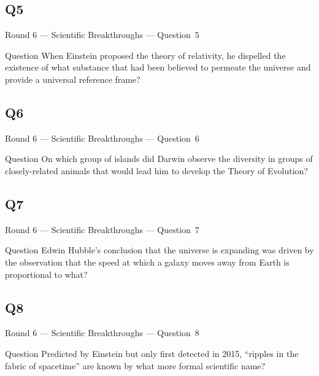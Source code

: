 \documentclass[11pt]{beamer}
\begin{document}
\subsection*{Q5}
\begin{frame}[t]{Round 6 --- Scientific Breakthroughs --- \mbox{Question 5}}
\vspace{-0.5em}
\begin{block}{Question}
When Einstein proposed the theory of relativity, he dispelled the existence of what substance that had been believed to permeate the universe and provide a universal reference frame?
\end{block}
\end{frame}
\subsection*{Q6}
\begin{frame}[t]{Round 6 --- Scientific Breakthroughs --- \mbox{Question 6}}
\vspace{-0.5em}
\begin{block}{Question}
On which group of islands did Darwin observe the diversity in groups of closely-related animals that would lead him to develop the Theory of Evolution?
\end{block}
\end{frame}
\subsection*{Q7}
\begin{frame}[t]{Round 6 --- Scientific Breakthroughs --- \mbox{Question 7}}
\vspace{-0.5em}
\begin{block}{Question}
Edwin Hubble's conclusion that the universe is expanding was driven by the observation that the speed at which a galaxy moves away from Earth is proportional to what?
\end{block}
\end{frame}
\subsection*{Q8}
\begin{frame}[t]{Round 6 --- Scientific Breakthroughs --- \mbox{Question 8}}
\vspace{-0.5em}
\begin{block}{Question}
Predicted by Einstein but only first detected in 2015, ``ripples in the fabric of spacetime'' are known by what more formal scientific name?
\end{block}
\end{frame}
\end{document}
